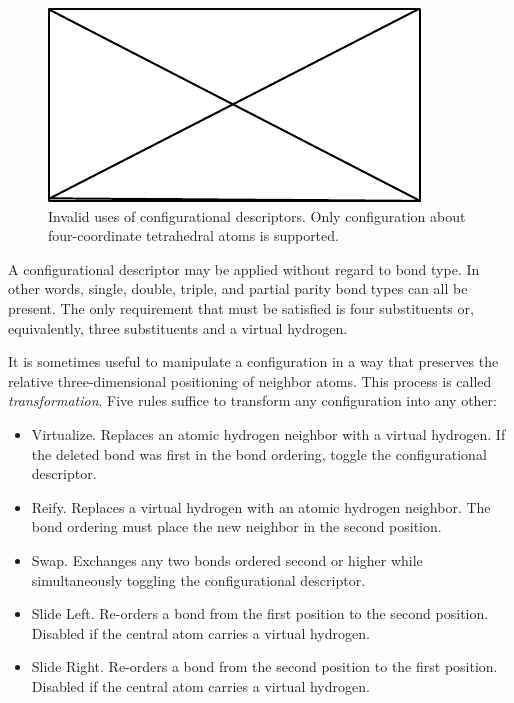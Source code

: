 \documentclass{article}
\begin{document}
\begin{figure}
    \centering
    \includegraphics{filler}
    \caption{Invalid uses of configurational descriptors. Only configuration about four-coordinate tetrahedral atoms is supported.}
    \label{fig:invalid-configurational-descriptors}
\end{figure}

A configurational descriptor may be applied without regard to bond type. In other words, single, double, triple, and partial parity bond types can all be present. The only requirement that must be satisfied is four substituents or, equivalently, three substituents and a virtual hydrogen.

It is sometimes useful to manipulate a configuration in a way that preserves the relative three-dimensional positioning of neighbor atoms. This process is called \textit{transformation}. Five rules suffice to transform any configuration into any other:

\begin{itemize}
    \item{Virtualize. Replaces an atomic hydrogen neighbor with a virtual hydrogen. If the deleted bond was first in the bond ordering, toggle the configurational descriptor.}
    \item{Reify. Replaces a virtual hydrogen with an atomic hydrogen neighbor. The bond ordering must place the new neighbor in the second position.}
    \item{Swap. Exchanges any two bonds ordered second or higher while simultaneously toggling the configurational descriptor.}
    \item{Slide Left. Re-orders a bond from the first position to the second position. Disabled if the central atom carries a virtual hydrogen.}
    \item{Slide Right. Re-orders a bond from the second position to the first position. Disabled if the central atom carries a virtual hydrogen.}
\end{itemize}
\end{document}
